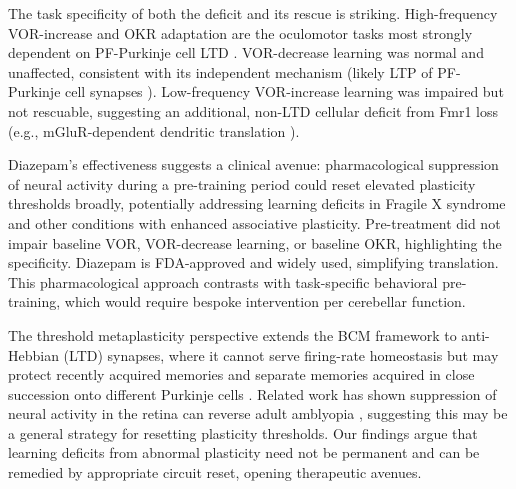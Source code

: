 \documentclass[11pt]{article}
\begin{document}
The task specificity of both the deficit and its rescue is striking. High-frequency VOR-increase and OKR adaptation are the oculomotor tasks most strongly dependent on PF-Purkinje cell LTD \cite{boyden2006selective,hansel2006alphaca,guo2014biphasic,kimpo2014learning,kakegawa2018dynamics,jang2020limbic,shim2022ltp,zhang2023vestibular}. VOR-decrease learning was normal and unaffected, consistent with its independent mechanism (likely LTP of PF-Purkinje cell synapses \cite{shim2022ltp,levram2003synaptic}). Low-frequency VOR-increase learning was impaired but not rescuable, suggesting an additional, non-LTD cellular deficit from Fmr1 loss (e.g., mGluR-dependent dendritic translation \cite{huber2002altered}).

Diazepam's effectiveness suggests a clinical avenue: pharmacological suppression of neural activity during a pre-training period could reset elevated plasticity thresholds broadly, potentially addressing learning deficits in Fragile X syndrome and other conditions with enhanced associative plasticity. Pre-treatment did not impair baseline VOR, VOR-decrease learning, or baseline OKR, highlighting the specificity. Diazepam is FDA-approved and widely used, simplifying translation. This pharmacological approach contrasts with task-specific behavioral pre-training, which would require bespoke intervention per cerebellar function.

The threshold metaplasticity perspective extends the BCM framework \cite{bienenstock1982theory,abraham1996metaplasticity} to anti-Hebbian (LTD) synapses, where it cannot serve firing-rate homeostasis but may protect recently acquired memories and separate memories acquired in close succession onto different Purkinje cells \cite{fusi2005cascade,benna2016computational}. Related work has shown suppression of neural activity in the retina can reverse adult amblyopia \cite{fong2021reversal}, suggesting this may be a general strategy for resetting plasticity thresholds. Our findings argue that learning deficits from abnormal plasticity need not be permanent and can be remedied by appropriate circuit reset, opening therapeutic avenues.



\end{document}
